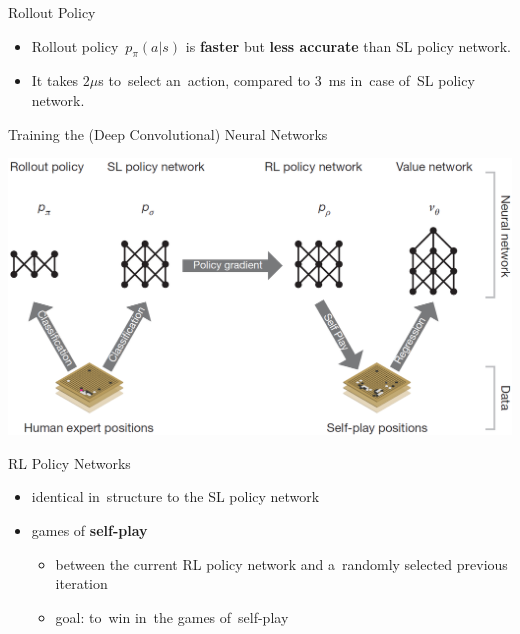 \documentclass{beamer}
\begin{document}
{    \begin{frame}{Rollout Policy}
      \begin{itemize}[<+- | alert@+>]
        \item Rollout policy~$p_\pi(a|s)$ is \textbf{faster} but \textbf{less accurate} than SL policy network.
        \item It takes $2 \mu$s to~select an~action, compared to $3$~ms in~case of~SL policy network.
      \end{itemize}
    \end{frame}

    \begin{frame}{Training the (Deep Convolutional) Neural Networks}
      \begin{center}
        \includegraphics[width=\textwidth]{../img/neural_nets_pipeline.png}
      \end{center}
    \end{frame}

    \begin{frame}{RL Policy Networks}
      \begin{itemize}[<+- | alert@+>]
        \item identical in~structure to the SL policy network
        \item games of \textbf{self-play}
          \begin{itemize}[<+- | alert@+>]
            \item between the current RL policy network and a~randomly selected previous iteration
            \item goal: to~win in~the games of~self-play
          \end{itemize}
      \end{itemize}
      \pause
    \end{frame}

}
\end{document}
